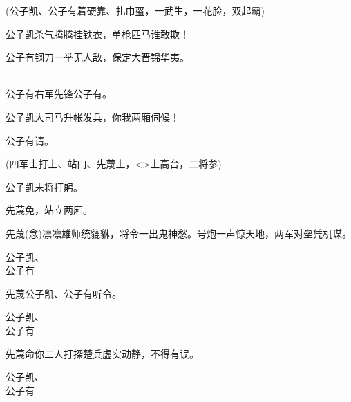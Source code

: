 {\vspace{5pt}

(公子凯、公子有{\hwfs 着}硬靠、扎巾盔，{\hwfs 一}武生，{\hwfs 一}花脸，{\hwfs 双起霸})

公子凯\hspace{20pt}杀气腾腾挂铁衣，单枪匹马谁敢欺！

公子有\hspace{20pt}钢刀一举无人敌，保定大晋锦华夷。

\\
公子有\hspace{20pt}右军先锋公子有。

公子凯\hspace{20pt}大司马升帐发兵，你我两厢伺候！

公子有\hspace{20pt}请。

({\hwfs 四}军士{\hwfs 打上}、{\hwfs 站门}、先蔑{\hwfs 上}，\textless{}\!\textgreater{}{\hwfs 上高台}，{\hwfs 二}将{\hwfs 参})

公子凯\hspace{20pt}末将打躬。

先蔑\hspace{30pt}免，站立两厢。

先蔑\hspace{30pt}({\akai 念})凛凛雄师统貔貅，将令一出鬼神愁。号炮一声惊天地，两军对垒凭机谋。


公子凯、\\
公子有\hspace{20pt}\raisebox{5pt}{元帅令出如山，末将等自然奋勇当先。}

先蔑\hspace{30pt}公子凯、公子有听令。

公子凯、\\
公子有\hspace{20pt}\raisebox{5pt}{在。}

先蔑\hspace{30pt}命你二人打探楚兵虚实动静，不得有误。

公子凯、\\
公子有\hspace{20pt}

}
